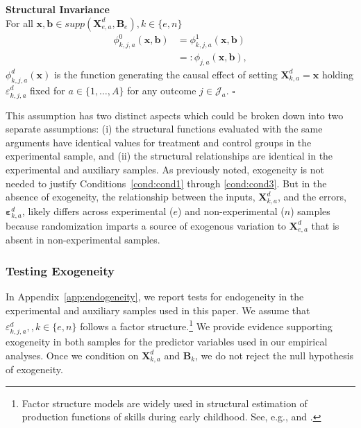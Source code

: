\onehalfspacing
\begin{assumption} \label{ass:summary} \textbf{Structural Invariance}\\
For all $\bm{x}, \bm{b} \in supp(\bm{X}^d_{e,a}, \bm{B}_e), k \in \{e,n\}$
\begin{align}
\phi_{k,j,a}^0 \left( \bm{x}, \bm{b} \right) &= \phi_{k,j,a}^1 (\bm{x}, \bm{b}) \\   \nonumber
                                                                     &=: \phi_{j,a} (\bm{x}, \bm{b}),
\end{align}
$\phi^d_{k,j,a}(\bm{x})$ is the function generating the causal effect of setting $\bm{X}^d_{k,a}=\bm{x}$ holding $\varepsilon^d_{k,j,a}$ fixed for $a \in \{1,\dots,A\}$ for any outcome $j \in \mathcal{J}_{a}$. $\square$
\end{assumption}
\doublespacing

This assumption has two distinct aspects which could be broken down into two separate assumptions: (i) the structural functions evaluated with the same arguments have identical values for treatment and control groups in the experimental sample, and (ii) the structural relationships are identical in the experimental and auxiliary samples. As previously noted, exogeneity is not needed to justify Conditions~\ref{cond:cond1} through \ref{cond:cond3}. But in the absence of exogeneity, the relationship between the inputs, $\bm{X}^d_{k,a}$, and the errors, $\bm{\varepsilon}^d_{k,a}$, likely differs across experimental ($e$) and non-experimental ($n$) samples because randomization imparts a source of exogenous variation to $\bm{X}^d_{e,a}$ that is absent in non-experimental samples.

\subsubsection{Testing Exogeneity}\label{section:accendog}

In  Appendix~\ref{app:endogeneity}, we report tests for endogeneity in the experimental and auxiliary samples used in this paper. We assume that $\varepsilon_{k,j,a}^d, , k \in \{e,n\}$ follows a factor structure.\footnote{Factor structure models are widely used in structural estimation of production functions of skills during early childhood. See, e.g., \cite{Cunha_Heckman_2008_JHR,Cunha_Heckman_etal_2010_est_tech_cognoncog} and \cite{Agostinelli_Wiswall_2016_EstimatingTech}.} We provide evidence supporting exogeneity in both samples for the predictor variables used in our empirical analyses. Once we condition on $\bm{X}_{k,a}^d$ and $\bm{B}_{k}$, we do not reject the null hypothesis of exogeneity.

